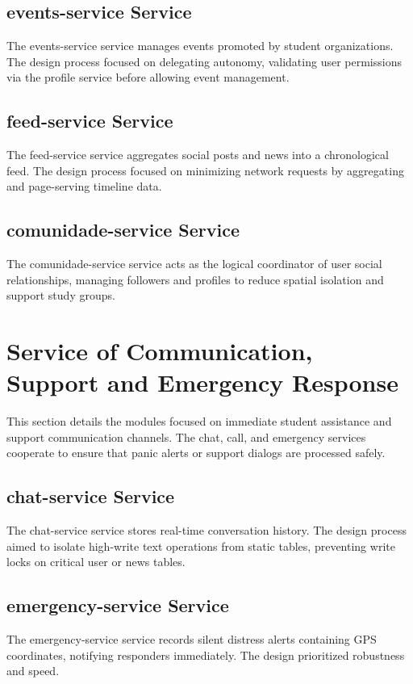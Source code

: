 \documentclass[12pt]{article}
\begin{document}
\subsection{events-service Service}
The events-service service manages events promoted by student organizations. The design process focused on delegating autonomy, validating user permissions via the profile service before allowing event management.

\subsection{feed-service Service}
The feed-service service aggregates social posts and news into a chronological feed. The design process focused on minimizing network requests by aggregating and page-serving timeline data.

\subsection{comunidade-service Service}
The comunidade-service service acts as the logical coordinator of user social relationships, managing followers and profiles to reduce spatial isolation and support study groups.

\section{Service of Communication, Support and Emergency Response}
This section details the modules focused on immediate student assistance and support communication channels. The chat, call, and emergency services cooperate to ensure that panic alerts or support dialogs are processed safely.

\subsection{chat-service Service}
The chat-service service stores real-time conversation history. The design process aimed to isolate high-write text operations from static tables, preventing write locks on critical user or news tables.

\subsection{emergency-service Service}
The emergency-service service records silent distress alerts containing GPS coordinates, notifying responders immediately. The design prioritized robustness and speed.
\end{document}
